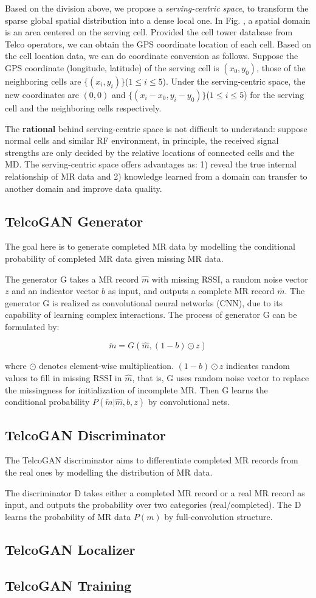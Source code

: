 Based on the division above, we propose a \emph{serving-centric space}, to transform the sparse global spatial distribution into a dense local one. In Fig. , a spatial domain is an area centered on the serving cell. Provided the cell tower database from Telco operators, we can obtain the GPS coordinate location of each cell. Based on the cell location data, we can do coordinate conversion as follows. Suppose the GPS coordinate (longitude, latitude) of the serving cell is $(x_0,y_0)$, those of the neighboring cells are $\{(x_i,y_i)\}$($1\leq i\leq 5$). Under the serving-centric space, the new coordinates are $(0,0)$ and $\{(x_i-x_0,y_i-y_0)\}$($1\leq i\leq 5$) for the serving cell and the neighboring cells respectively.

The \textbf{rational} behind serving-centric space is not difficult to understand: suppose normal cells and similar RF environment, in principle, the received signal strengths are only decided by the relative locations of connected cells and the MD. The serving-centric space offers advantages as: 1) reveal the true internal relationship of MR data and 2) knowledge learned from a domain can transfer to another domain and improve data quality.


\subsection{TelcoGAN Generator}
The goal here is to generate completed MR data by modelling the conditional probability of completed MR data given missing MR data.

The generator G takes a MR record $\hat{m}$ with missing RSSI, a random noise vector $z$ and an indicator vector $b$ as input, and outputs a complete MR record $\bar{m}$. The generator G is realized as convolutional neural networks (CNN), due to its capability of learning complex interactions. The process of generator G can be formulated by:

\begin{equation}\label{eq:gen}
  \tilde{m} = G(\hat{m}, (1-b)\odot z)
\end{equation}

where $\odot$ denotes element-wise multiplication. $(1-b)\odot z$ indicates random values to fill in missing RSSI in $\hat{m}$, that is, G uses random noise vector to replace the missingness for initialization of incomplete MR. Then G learns the conditional probability $P(\tilde{m}|\hat{m}, b, z)$ by convolutional nets.

\subsection{TelcoGAN Discriminator}
The TelcoGAN discriminator aims to differentiate completed MR records from the real ones by modelling the distribution of MR data.

The discriminator D takes either a completed MR record or a real MR record as input, and outputs the probability over two categories (real/completed). The D learns the probability of MR data $P(m)$ by full-convolution structure.

\subsection{TelcoGAN Localizer}


\subsection{TelcoGAN Training}
